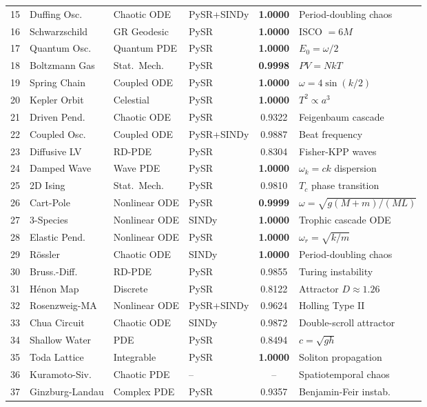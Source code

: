\begin{table}[t]
\begin{tabular}{rlllcl}
15 & Duffing Osc. & Chaotic ODE & PySR+SINDy & \textbf{1.0000} & Period-doubling chaos \\
16 & Schwarzschild & GR Geodesic & PySR & \textbf{1.0000} & ISCO $= 6M$ \\
17 & Quantum Osc. & Quantum PDE & PySR & \textbf{1.0000} & $E_0 = \omega/2$ \\
18 & Boltzmann Gas & Stat.\ Mech. & PySR & \textbf{0.9998} & $PV = NkT$ \\
19 & Spring Chain & Coupled ODE & PySR & \textbf{1.0000} & $\omega = 4\sin(k/2)$ \\
20 & Kepler Orbit & Celestial & PySR & \textbf{1.0000} & $T^2 \propto a^3$ \\
21 & Driven Pend. & Chaotic ODE & PySR & 0.9322 & Feigenbaum cascade \\
22 & Coupled Osc. & Coupled ODE & PySR+SINDy & 0.9887 & Beat frequency \\
23 & Diffusive LV & RD-PDE & PySR & 0.8304 & Fisher-KPP waves \\
24 & Damped Wave & Wave PDE & PySR & \textbf{1.0000} & $\omega_k = ck$ dispersion \\
25 & 2D Ising & Stat.\ Mech. & PySR & 0.9810 & $T_c$ phase transition \\
26 & Cart-Pole & Nonlinear ODE & PySR & \textbf{0.9999} & $\omega = \sqrt{g(M{+}m)/(ML)}$ \\
27 & 3-Species & Nonlinear ODE & SINDy & \textbf{1.0000} & Trophic cascade ODE \\
28 & Elastic Pend. & Nonlinear ODE & PySR & \textbf{1.0000} & $\omega_r = \sqrt{k/m}$ \\
29 & R\"ossler & Chaotic ODE & SINDy & \textbf{1.0000} & Period-doubling chaos \\
30 & Bruss.-Diff. & RD-PDE & PySR & 0.9855 & Turing instability \\
31 & H\'enon Map & Discrete & PySR & 0.8122 & Attractor $D \approx 1.26$ \\
32 & Rosenzweig-MA & Nonlinear ODE & PySR+SINDy & 0.9624 & Holling Type II \\
33 & Chua Circuit & Chaotic ODE & SINDy & 0.9872 & Double-scroll attractor \\
34 & Shallow Water & PDE & PySR & 0.8494 & $c = \sqrt{gh}$ \\
35 & Toda Lattice & Integrable & PySR & \textbf{1.0000} & Soliton propagation \\
36 & Kuramoto-Siv. & Chaotic PDE & -- & -- & Spatiotemporal chaos \\
37 & Ginzburg-Landau & Complex PDE & PySR & 0.9357 & Benjamin-Feir instab. \\

\end{tabular}
\end{table}
